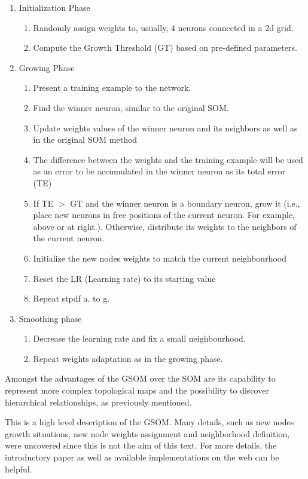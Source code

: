 \begin{enumerate}
    \item Initialization Phase
    \begin{enumerate}
        \item Randomly assign weights to, usually, 4 neurons connected in a 2d grid.
        \item Compute the Growth Threshold (GT) based on pre-defined parameters. 
    \end{enumerate}
    \item Growing Phase 
    \begin{enumerate}
        \item Present a training example to the network.
        \item Find the winner neuron, similar to the original SOM.
        \item Update weights values of the winner neuron and its neighbors as well as in the original SOM method
        \item The difference between the weights and the training example will be used as an error to be accumulated in the winner neuron as its total error (TE)
        \item If TE $>$ GT and the winner neuron is a boundary neuron, grow it (i.e., place new neurons in free positions of the current neuron. For example, above or at right.). Otherwise, distribute its weights to the neighbors of the current neuron.
        \item Initialize the new nodes weights to match the current neighbourhood
        \item Reset the LR (Learning rate) to its starting value
        \item Repeat stpdf a. to g.
    \end{enumerate}
    \item Smoothing phase
    \begin{enumerate}
        \item Decrease the learning rate and fix a small neighbourhood.
        \item Repeat weights adaptation as in the growing phase.
    \end{enumerate}
\end{enumerate}

Amongst the advantages of the GSOM over the SOM are its capability to represent more complex topological maps and the possibility to discover hierarchical relationships, as previously mentioned.

This is a high level description of the GSOM. Many details, such as new nodes growth situations, new node weights assignment and neighborhood definition, were uncovered since this is not the aim of this text. For more details, the introductory paper \cite{Alahakoon:2000} as well as available implementations on the web can be helpful.



